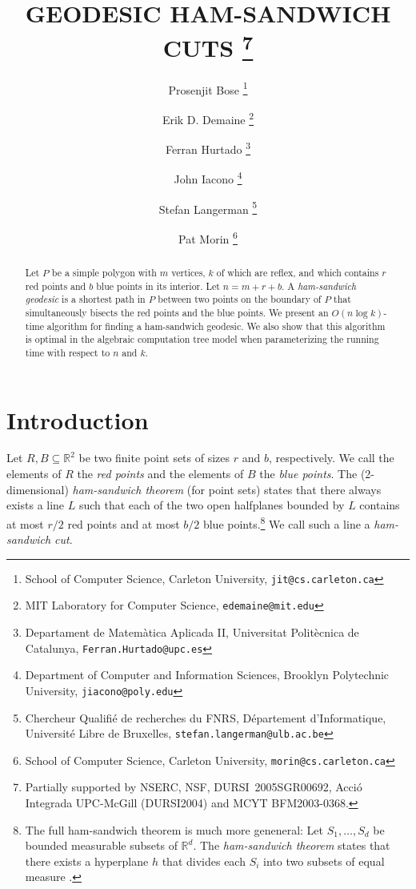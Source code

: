 \documentclass[charterfonts,lotsofwhite]{patmorin}
\newcommand{\email}[1]{\texttt{#1}}
\begin{document}
\title{\MakeUppercase{Geodesic Ham-Sandwich Cuts}%
  \thanks{Partially supported by  NSERC, NSF, DURSI~2005SGR00692, Acció Integrada
UPC-McGill (DURSI2004) and MCYT BFM2003-0368.}}
\author{Prosenjit Bose%
	\thanks{School of Computer Science, Carleton University,
		\email{jit@cs.carleton.ca}}
   \and Erik D. Demaine%
	\thanks{MIT Laboratory for Computer Science, 
		\email{edemaine@mit.edu}}
   \and Ferran Hurtado%
	\thanks{Departament de Matem\`atica Aplicada II, 
		Universitat Polit\`ecnica de Catalunya, 
		\email{Ferran.Hurtado@upc.es}}
   \and John Iacono%
        \thanks{Department of Computer and Information Sciences,
		Brooklyn Polytechnic University,
		\email{jiacono@poly.edu}}
   \and Stefan Langerman%
	\thanks{Chercheur Qualifi\'e de recherches du FNRS, 
		D\'epartement d'Informatique,
		Universit\'e Libre de Bruxelles,
		\email{stefan.langerman@ulb.ac.be}}
   \and Pat Morin%
        \thanks{School of Computer Science, Carleton University,
		\email{morin@cs.carleton.ca}}
}
\date{}
\maketitle

\begin{abstract} Let $P$ be a simple polygon with $m$ vertices, $k$ of
which are reflex, and which contains $r$ red points and $b$ blue
points in its interior.  Let $n=m+r+b$. A \emph{ham-sandwich geodesic}
is a shortest path in $P$ between two points on the boundary of $P$
that simultaneously bisects the red points and the blue points.  We
present an $O(n \log k)$-time algorithm for finding a ham-sandwich
geodesic.  We also show that this algorithm is optimal in the
algebraic computation tree model when parameterizing the running time
with respect to $n$ and $k$.  \end{abstract}


\section{Introduction}

Let $R,B\subseteq \mathbb{R}^2$ be two finite point sets of sizes $r$
and $b$, respectively.  We call the elements of $R$ the \emph{red
points} and the elements of $B$ the \emph{blue points}.  The
(2-dimensional) \emph{ham-sandwich theorem} (for point sets) states
that there always exists a line $L$ such that each of the two open
halfplanes bounded by $L$ contains at most $r/2$ red points and at
most $b/2$ blue points.\footnote{The full ham-sandwich theorem is much
more geneneral:  Let $S_1,\ldots,S_d$ be bounded measurable subsets of
$\mathbb{R}^d$.  The \emph{ham-sandwich theorem} states that there
exists a hyperplane $h$ that divides each $S_i$ into two subsets of
equal measure \cite{st42}.}  We call such a line a \emph{ham-sandwich
cut}.
\end{document}
